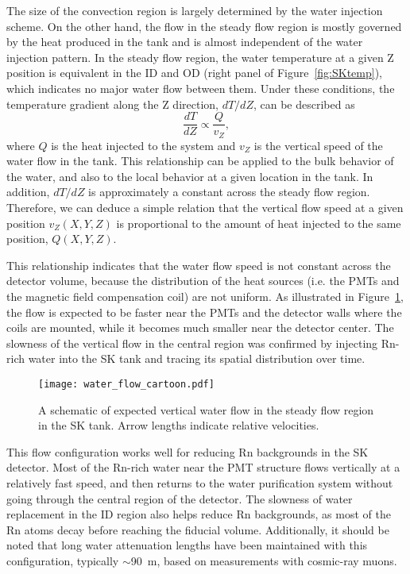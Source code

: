 \documentclass[preprint,12pt]{elsarticle}
\begin{document}
The size of the
convection region is largely determined by the water injection scheme. On the other hand, the flow in the steady flow
region is mostly governed by the heat produced in the tank and
is almost independent of the water injection pattern. 
In the steady flow region, the water temperature at a given Z position
is equivalent in the ID and OD (right panel of Figure~\ref{fig:SKtemp}), which indicates no 
major water flow between them.
Under these conditions, the temperature gradient along the Z direction,
$dT/dZ$, can be described as 
\begin{equation}
  \label{eq:1}
  \frac{dT}{dZ}\propto \frac{Q}{v_Z},
\end{equation}
where $Q$ is the heat injected to the system and $v_Z$ is the vertical
speed of the water flow in the tank. This relationship can be applied
to the
bulk behavior of the water, and also to the local behavior at a
given location in the tank.
In addition, $dT/dZ$ is approximately a constant across the
steady flow region.
Therefore, we can deduce a simple relation that the vertical flow
speed at a given position $v_Z(X,Y,Z)$ is proportional to the amount of
heat injected to the same position, $Q(X,Y,Z)$.

This relationship indicates that the water flow speed is not constant
across the detector volume, because the distribution of the heat sources
 (i.e. the PMTs and the magnetic field compensation coil) are
not uniform.
As illustrated in Figure~\ref{fig:water_flow_cartoon}, the flow is expected to be faster near the PMTs and the detector walls where the coils are mounted,
while it becomes much smaller near the detector center.
The slowness of the vertical flow in the central region was
confirmed by injecting Rn-rich water into the SK tank and tracing its spatial distribution over time.

\begin{figure}[htb]
\begin{center}
\texttt{[image: water\_flow\_cartoon.pdf]}
\caption{A schematic of expected vertical water flow in the steady
  flow region in the SK tank.  Arrow lengths indicate relative velocities.
}
\label{fig:water_flow_cartoon}
\end{center}
\end{figure}


This flow configuration works well for reducing Rn backgrounds in the
SK detector.
Most of the Rn-rich water near the PMT structure flows vertically at a
relatively fast speed, and then returns to the water purification system without
going through the central region of the detector.
The slowness of water replacement in the ID region also helps reduce
Rn backgrounds, as most of the 
Rn atoms decay before reaching the fiducial volume.
Additionally, it should be noted that long water attenuation lengths have been maintained 
with this configuration, typically $\sim$90~m, based on measurements with cosmic-ray muons.
\end{document}
